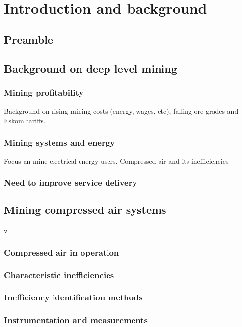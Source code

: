 \chapter{Introduction and background}  %
\setcounter{page}{1}
\section{Preamble}

\section{Background on deep level mining}

\subsection{Mining profitability}
Background on rising mining costs (energy, wages, etc), falling ore grades and Eskom tariffs.\cite{neingo2016trends}
%	


\subsection{Mining systems and energy}
Focus an mine electrical energy users. Compressed air and its inefficiencies
\subsection{Need to improve service delivery}
\section{Mining compressed air systems}v
	\subsection{Compressed air in operation}
	\subsection{Characteristic inefficiencies}
	\subsection{Inefficiency identification methods}
	\subsection{Instrumentation and measurements}

